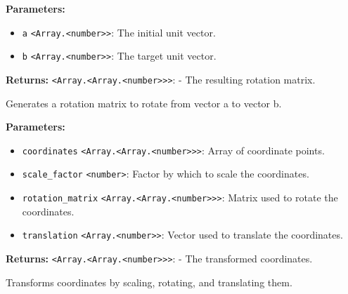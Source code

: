 \documentclass[12pt,a4paper]{article}
\begin{document}
\noindent \textbf{Parameters:}
\begin{itemize}
  \item \texttt{a} \texttt{<Array.<number>>}: The initial unit vector.
  \item \texttt{b} \texttt{<Array.<number>>}: The target unit vector.
\end{itemize}

\noindent \textbf{Returns:} \texttt{<Array.<Array.<number>>>}: - The resulting rotation matrix.

\noindent Generates a rotation matrix to rotate from vector a to vector b.

\vspace{5mm}
\noindent {}


\noindent \textbf{Parameters:}
\begin{itemize}
  \item \texttt{coordinates} \texttt{<Array.<Array.<number>>>}: Array of coordinate points.
  \item \texttt{scale\_factor} \texttt{<number>}: Factor by which to scale the coordinates.
  \item \texttt{rotation\_matrix} \texttt{<Array.<Array.<number>>>}: Matrix used to rotate the coordinates.
  \item \texttt{translation} \texttt{<Array.<number>>}: Vector used to translate the coordinates.
\end{itemize}

\noindent \textbf{Returns:} \texttt{<Array.<Array.<number>>>}: - The transformed coordinates.

\noindent Transforms coordinates by scaling, rotating, and translating them.

\vspace{5mm}
\noindent {}
\end{document}
